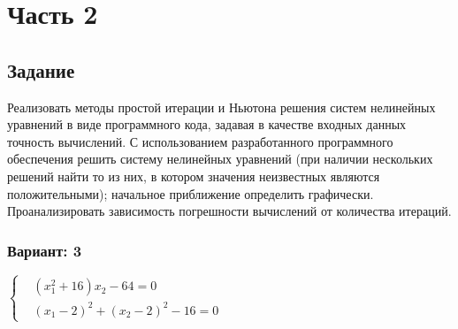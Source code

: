 
\chapter*{Часть 2}

\section*{Задание}
Реализовать методы простой итерации и Ньютона решения систем нелинейных уравнений в
виде программного кода, задавая в качестве входных данных точность вычислений. С
использованием разработанного программного обеспечения решить систему нелинейных
уравнений (при наличии нескольких решений найти то из них, в котором значения неизвестных
являются положительными); начальное приближение определить графически.
Проанализировать зависимость погрешности вычислений от количества итераций. 

\subsection*{Вариант: 3}


$\left\{\begin{aligned}
    & (x_1^2 + 16)x_2 - 64 = 0 \\
    & (x_1 - 2)^2 + (x_2 - 2)^2 - 16 = 0
\end{aligned}\right.$

\pagebreak
